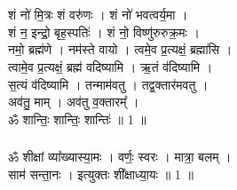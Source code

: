 \section{}
\subsection{}
शं नो॑ मि॒त्रः शं वरु॑णः । शं नो॑ भवत्वर्य॒मा ।\\
शं न॒ इन्द्रो॒ बृह॒स्पतिः॑ । शं नो॒ विष्णु॑रुरुक्र॒मः ।\\
नमो॒ ब्रह्म॑णे । नम॑स्ते वायो । त्वमे॒व प्र॒त्यक्षं॒ ब्रह्मा॑सि ।\\
त्वामे॒व प्र॒त्यक्षं॒ ब्रह्म॑ वदिष्यामि । ऋ॒तं व॑दिष्यामि ।\\
स॒त्यं व॑दिष्यामि । तन्माम॑वतु । तद्व॒क्तार॑मवतु ।\\
अव॑तु॒ माम् । अव॑तु व॒क्तारम्᳚ ।\\
ॐ शान्तिः॒ शान्तिः॒ शान्तिः॑ ॥ 1 ॥\\
\subsubsection{}
{\small ॐ} शीक्षां व्या᳚ख्यास्या॒मः । वर्णः॒ स्वरः । मात्रा॒ बलम् ।\\
साम॑ सन्ता॒नः । इत्युक्तः शी᳚क्षाध्या॒यः ॥ 1 ॥\\
